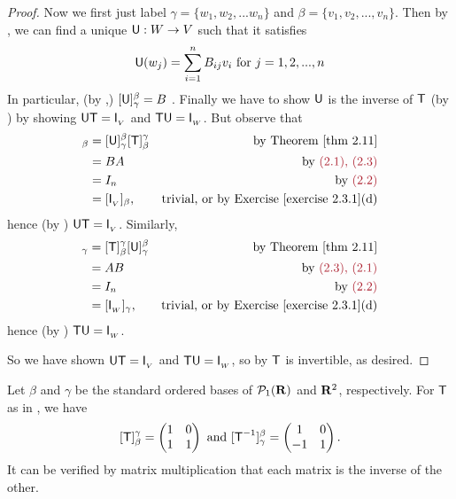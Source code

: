 \begin{proof}
Now we first just label \(\gamma = \{ w_1, w_2, ... w_n \}\) and \(\beta = \{ v_1, v_2, ..., v_n \}\).
Then by , we can find a unique \LTRAN{} \(\textsf{U} : W \to V\) such that it satisfies
\[
    \textsf{U}(w_j) = \sum_{i = 1}^n B_{ij} v_{i} \text{ for \(j = 1, 2, ..., n\)}
\]
In particular, (by ,) \([\textsf{U}]_{\gamma}^{\beta} = B\) .
Finally we have to show \(\textsf{U}\) is the inverse of \(\textsf{T}\) (by ) by showing \(\textsf{U}\textsf{T} = \textsf{I}_{_V}\) and \(\textsf{T}\textsf{U} = \textsf{I}_{_W}\).
But observe that
\begin{align*}
    [\U\T]_{\beta} & = [\U]_{\gamma}^{\beta} [\T]_{\beta}^{\gamma} & \text{by \THM{2.11}} \\
                   & = BA & \text{by \MAROON{(2.1), (2.3)}} \\
                   & = I_n & \text{by \MAROON{(2.2)}} \\
                   & = [\ITRANV]_{\beta}, & \text{trivial, or by \EXEC{2.3.1}(d)}
\end{align*}
hence (by ) \(\textsf{U}\textsf{T} = \textsf{I}_{_V}\).
Similarly,
\begin{align*}
    [\T\U]_{\gamma} & = [\T]_{\beta}^{\gamma} [\U]_{\gamma}^{\beta} & \text{by \THM{2.11}} \\
                   & = AB & \text{by \MAROON{(2.3), (2.1)}} \\
                   & = I_n & \text{by \MAROON{(2.2)}} \\
                   & = [\ITRANW]_{\gamma}, & \text{trivial, or by \EXEC{2.3.1}(d)}
\end{align*}
hence (by ) \(\textsf{T}\textsf{U} = \textsf{I}_{_W}\).

So we have shown \(\textsf{U}\textsf{T} = \textsf{I}_{_V}\) and \(\textsf{T}\textsf{U} = \textsf{I}_{_W}\), so by  \(\textsf{T}\) is invertible, as desired.
\end{proof}

\begin{example} \label{example 2.4.3}
Let \(\beta\) and \(\gamma\) be the standard ordered bases of \(\mathcal{P}_1(\mathbf{R})\) and \(\mathbf{R}^2\), respectively.
For \(\textsf{T}\) as in , we have
\[
    [\textsf{T}]_{\beta}^{\gamma} = \begin{pmatrix} 1 & 0 \\ 1 & 1 \end{pmatrix}
    \text{ and }
    [\textsf{T}^{-1}]_{\gamma}^{\beta} = \begin{pmatrix} 1 & 0 \\ -1 & 1 \end{pmatrix}.
\]
It can be verified by matrix multiplication that each matrix is the inverse of the other.
\end{example}


